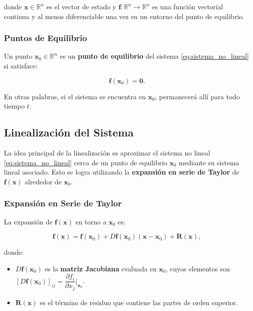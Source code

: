 \documentclass[12pt, a4paper]{report}
\begin{document}
donde \(\mathbf{x} \in \mathbb{R}^n\) es el vector de estado y \(\mathbf{f}: \mathbb{R}^n \to \mathbb{R}^n\) es una función vectorial continua y al menos diferenciable una vez en un entorno del punto de equilibrio.

\subsubsection{Puntos de Equilibrio}

Un punto \(\mathbf{x}_0 \in \mathbb{R}^n\) es un \textbf{punto de equilibrio} del sistema \eqref{eq:sistema_no_lineal} si satisface:

\begin{equation}
    \mathbf{f}(\mathbf{x}_0) = \mathbf{0}.
\end{equation}

En otras palabras, si el sistema se encuentra en \(\mathbf{x}_0\), permanecerá allí para todo tiempo \( t \).

\subsection{Linealización del Sistema}

La idea principal de la linealización es aproximar el sistema no lineal \eqref{eq:sistema_no_lineal} cerca de un punto de equilibrio \(\mathbf{x}_0\) mediante su sistema lineal asociado. Esto se logra utilizando la \textbf{expansión en serie de Taylor} de \(\mathbf{f}(\mathbf{x})\) alrededor de \(\mathbf{x}_0\).

\subsubsection{Expansión en Serie de Taylor}

La expansión de \(\mathbf{f}(\mathbf{x})\) en torno a \(\mathbf{x}_0\) es:

\begin{equation}
    \mathbf{f}(\mathbf{x}) = \mathbf{f}(\mathbf{x}_0) + D\mathbf{f}(\mathbf{x}_0)(\mathbf{x} - \mathbf{x}_0) + \mathbf{R}(\mathbf{x}),
\end{equation}

donde:

\begin{itemize}
    \item \( D\mathbf{f}(\mathbf{x}_0) \) es la \textbf{matriz Jacobiana} evaluada en \(\mathbf{x}_0\), cuyos elementos son \( \left[ D\mathbf{f}(\mathbf{x}_0) \right]_{ij} = \dfrac{\partial f_i}{\partial x_j} \bigg|_{\mathbf{x}_0} \).
    \item \( \mathbf{R}(\mathbf{x}) \) es el término de residuo que contiene las partes de orden superior.
\end{itemize}
\end{document}

